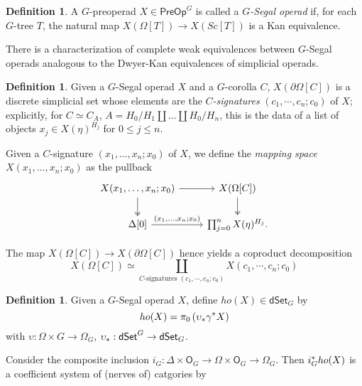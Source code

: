 \documentclass[a4paper,10pt
,draft
]{article}%
\numberwithin{equation}{section}
\numberwithin{figure}{section}
\theoremstyle{definition} %
\newtheorem{definition}[equation]{Definition}%
\newcommand{\dSet}{\mathsf{dSet}}
\newcommand{\1}{\ensuremath{\mathbbm 1}}%
\begin{document}
\begin{definition}
	A $G$-preoperad $X \in \mathsf{PreOp}^G$ is called a \textit{$G$-Segal operad} if, 
	for each $G$-tree $T$,
	the natural map 
	$X\left( \Omega[T] \right) \to 
	X \left( Sc[T] \right)$
	is a Kan equivalence.
\end{definition}

There is a characterization of complete weak equivalences between $G$-Segal operads analogous to the Dwyer-Kan equivalences of simplicial operads. 
\begin{definition}%
      Given a $G$-Segal operad $X$ and a $G$-corolla $C$,
      $X(\partial \Omega[C])$ is a discrete simplicial set whose elements
      are the \textit{$C$-signatures} $(c_1,\cdots,c_n;c_0)$ of $X$;
      explicitly, for $C \simeq C_A$, $A = H_0/H_1 \amalg \dots \amalg H_0/H_n$, this is the data of
      a list of objects $x_j \in X(\eta)^{H_j}$ for $0 \leq j \leq n$.

      Given a $C$-signature $(x_1, \dots, x_n; x_0)$ of $X$, we define the \textit{mapping space} $X(x_1,\dots,x_n; x_0)$ as the pullback
      \[
            \begin{tikzcd}
                  X(x_1, \dots, x_n; x_0) \arrow[r] \arrow[d, twoheadrightarrow]
                  &
                  X(\Omega[C]) \arrow[d, twoheadrightarrow]
                  \\
                  \Delta[0] \arrow[r, "{(x_1, \dots, x_n;x_0)}"]
                  &
                  \prod_{j = 0}^n X(\eta)^{H_j}.
            \end{tikzcd}
      \]

      The map $X(\Omega[C]) \to X(\partial \Omega[C])$ hence yields
      a coproduct decomposition 
      \[
            X(\Omega[C]) \simeq \coprod_{C\text{-signatures }(c_1,\cdots,c_n;c_0)}
            X(c_1,\cdots,c_n;c_0)
      \]    
\end{definition}

\begin{definition}
      Given a $G$-Segal operad $X$, define $ho(X) \in \dSet_G$ by
      \[
            ho(X) = \pi_0\left(\upsilon_{\**}\gamma^{\**}X\right)
      \]
      with $\upsilon: \Omega \times G \to \Omega_G$, $\upsilon_{\**}: \dSet^G \to \dSet_G$.

      Consider the composite inclusion $i_G: \Delta \times \mathsf O_G \to \Omega \times \mathsf O_G \to \Omega_G$.
      Then $i_G^{\**}ho(X)$ is a coefficient system of (nerves of) catgories by \cite[Prop. 5.9, Remark 5.11]{BP_edss}
\end{definition}
\end{document}

